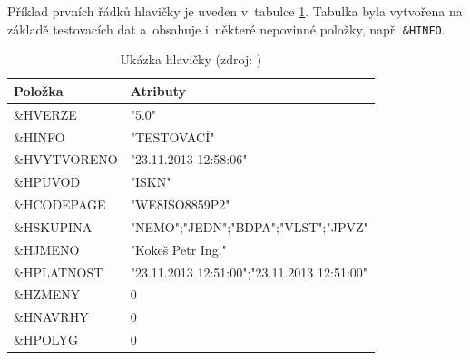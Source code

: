 \documentclass[a4paper,12pt,oneside]{book}
\begin{document}
Příklad prvních řádků hlavičky je uveden v~tabulce
\ref{t_hlavicka_priklad}. Tabulka byla vytvořena na základě
testovacích dat a~obsahuje i~některé nepovinné položky,
např. \texttt{\&HINFO}.

\begin{table}[htbp]
\centering
\caption[Ukázka hlavičky]{Ukázka hlavičky (zdroj: \cite{vfk_struktura})}
\begin{tabular}{ll}
\toprule
\textbf{Položka} & \textbf{Atributy} \\ 
\midrule
\&HVERZE & "5.0" \\ 
\&HINFO & "TESTOVACÍ" \\ 
\&HVYTVORENO & "23.11.2013 12:58:06" \\ 
\&HPUVOD & "ISKN" \\ 
\&HCODEPAGE & "WE8ISO8859P2" \\ 
\&HSKUPINA & "NEMO";"JEDN";"BDPA";"VLST";"JPVZ" \\ 
\&HJMENO & "Kokeš Petr Ing." \\ 
\&HPLATNOST & "23.11.2013 12:51:00";"23.11.2013 12:51:00" \\ 
\&HZMENY & 0 \\ 
\&HNAVRHY & 0 \\ 
\&HPOLYG & 0 \\ 
\bottomrule
\end{tabular}
\label{t_hlavicka_priklad}
\end{table}
\end{document}
